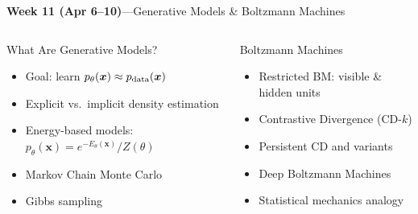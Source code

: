 \documentclass[aspectratio=169,11pt]{beamer}
\begin{document}
\begin{frame}{{\color{mlgold}\textbf{Week 11 (Apr 6--10)}\;---\;Generative Models \& Boltzmann Machines}}
  \begin{columns}[T]
      \begin{block}{What Are Generative Models?}
        \begin{itemize}\itemsep1pt
          \item Goal: learn $p_\theta(\bm{x})\approx p_{\rm data}(\bm{x})$
          \item Explicit vs.\ implicit density estimation
          \item Energy-based models:
                $p_\theta(\bm{x}) = e^{-E_\theta(\bm{x})}/Z(\theta)$
          \item Markov Chain Monte Carlo
          \item Gibbs sampling
        \end{itemize}
      \end{block}
      \begin{block}{Boltzmann Machines}
        \begin{itemize}\itemsep1pt
          \item Restricted BM: visible \& hidden units
          \item Contrastive Divergence (CD-$k$)
          \item Persistent CD and variants
          \item Deep Boltzmann Machines
          \item Statistical mechanics analogy
        \end{itemize}
      \end{block}
  \end{columns}
\end{frame}
\end{document}
